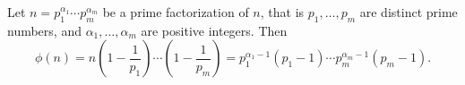 

\setcounter{section}{5}
\setcounter{subsection}{3}
\setcounter{dfn}{3}

\begin{thm}
Let $n = p_1^{\alpha_1} \cdots p_m^{\alpha_m}$ be a prime factorization of $n$, that is
$p_1, \ldots, p_m$ are distinct prime numbers, and $\alpha_1, \ldots, \alpha_m$ are positive integers.
Then
\[
\phi(n) = n\left(1-\frac{1}{p_1}\right) \cdots \left(1-\frac{1}{p_m}\right)
= p_1^{\alpha_1-1}(p_1-1) \cdots p_m^{\alpha_m-1}(p_m-1).
\]
\end{thm}


